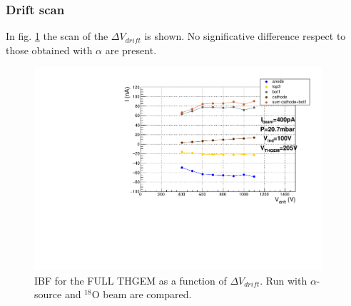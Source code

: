 \documentclass[a4paper, 11 pt]{report}
\newcommand{\Vdrift}{$ \Delta V_{drift}$}
\begin{document}
  \clearpage
 \subsubsection{Drift scan}

  In fig. \ref{fig:DriftScan_FULL_beam} the scan of the \Vdrift{} is shown. No significative
  difference respect to those obtained with $\alpha$ are present.
  \begin{figure}[htbp]
	\centering
	\includegraphics[width=0.95\textwidth]{Immagini/driftScan_THGEM10_20mbar-Vthgem205V-2020-03-09.pdf}
	\caption{IBF for the FULL THGEM as a function of \Vdrift. Run with 
	$\alpha$-source	and $^{18}$O beam are compared.}
	\label{fig:DriftScan_FULL_beam}
  \end{figure}
\end{document}
